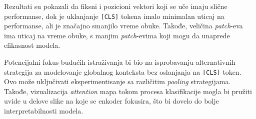 \documentclass[12pt]{article}
\begin{document}
   Rezultati su pokazali da fiksni i pozicioni vektori koji se uče imaju slične 
   performanse, dok je uklanjanje \texttt{[CLS]} tokena imalo minimalan uticaj na 
   performanse, ali je značajno smanjilo vreme obuke. Takođe, veličina \textit{patch}-eva 
   ima uticaj na vreme obuke, s manjim \textit{patch}-evima koji mogu da 
   unaprede efikasnost modela.

   Potencijalni fokus budućih istraživanja bi bio na isprobavanju alternativnih strategija 
   za modelovanje globalnog konteksta bez oslanjanja na \texttt{[CLS]} token. Ovo može 
   uključivati eksperimentisanje sa različitim \textit{pooling} strategijama. Takođe, 
   vizualizacija \textit{attention} mapa tokom procesa klasifikacije mogla bi pružiti uvide u 
   delove slike na koje se enkoder fokusira, što bi dovelo do bolje interpretabilnosti modela.

   \newpage
   \printbibliography[title={Literatura}]
\end{document}
